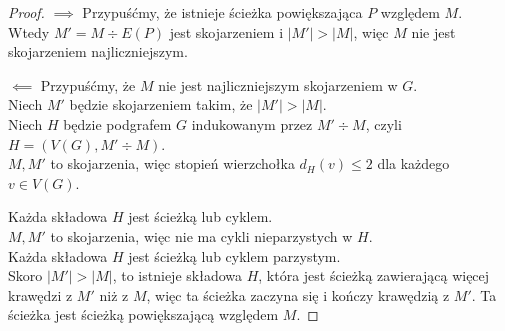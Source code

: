 \begin{proof}
	$\implies$ Przypuśćmy, że istnieje ścieżka powiększająca $P$ względem $M$. \\
	Wtedy $M' = M \div E(P)$ jest skojarzeniem i $|M'| > |M|$, więc $M$ nie jest skojarzeniem najliczniejszym.

	$\impliedby$ Przypuśćmy, że $M$ nie jest najliczniejszym skojarzeniem w $G$. \\
	Niech $M'$ będzie skojarzeniem takim, że $|M'| > |M|$. \\
	Niech $H$ będzie podgrafem $G$ indukowanym przez $M' \div M$, czyli $H = (V(G), M' \div M)$. \\
	$M, M'$ to skojarzenia, więc stopień wierzchołka $d_H(v) \le 2$ dla każdego $v \in V(G)$.

	Każda składowa $H$ jest ścieżką lub cyklem. \\
	$M, M'$ to skojarzenia, więc nie ma cykli nieparzystych w $H$. \\
	Każda składowa $H$ jest ścieżką lub cyklem parzystym. \\
	Skoro $|M'| > |M|$, to istnieje składowa $H$, która jest ścieżką zawierającą więcej krawędzi z $M'$ niż z $M$, więc ta ścieżka zaczyna się i kończy krawędzią z $M'$. Ta ścieżka jest ścieżką powiększającą względem $M$.
\end{proof}
